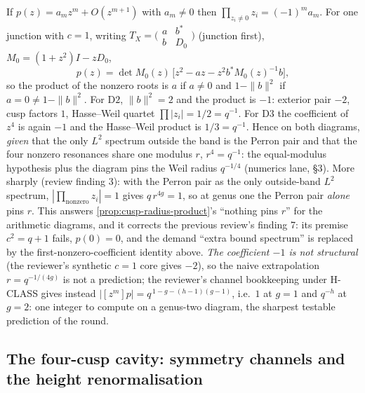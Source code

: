 \begin{proposition}
\label{prop:nonzero-root-product}
If $p(z) = a_mz^m+O(z^{m+1})$ with $a_m\ne0$ then $\prod_{z_i\ne0}z_i = (-1)^ma_m$. For one junction with
$c = 1$, writing $T_X = \big(\begin{smallmatrix}a&b^{*}\\b&D_0\end{smallmatrix}\big)$ (junction first),
$M_0 = (1+z^2)I-zD_0$,
\[
p(z) = \det M_0(z)\,\big[z^2-az-z^2b^{*}M_0(z)^{-1}b\big],
\]
so the product of the nonzero roots is $a$ if $a\ne0$ and $1-\|b\|^2$ if $a = 0\ne1-\|b\|^2$. For
$\mathrm{D2}$, $\|b\|^2 = 2$ and the product is $-1$: exterior pair $-2$, cusp factors $1$, Hasse--Weil
quartet $\prod|z_i| = 1/2 = q^{-1}$. For $\mathrm{D3}$ the coefficient of $z^4$ is again $-1$ and the
Hasse--Weil product is $1/3 = q^{-1}$. Hence on both diagrams, \emph{given} that the only $L^2$ spectrum
outside the band is the Perron pair and that the four nonzero resonances share one modulus $r$,
$r^4 = q^{-1}$: the equal-modulus hypothesis plus the diagram pins the Weil radius $q^{-1/4}$ (numerics
lane, \S3). More sharply (review finding 3): with the Perron pair as the only outside-band $L^2$ spectrum,
$|\prod_{\text{nonzero}}z_i| = 1$ gives $q\,r^{4g} = 1$, so at genus one the Perron pair \emph{alone} pins $r$.
This answers \cref{prop:cusp-radius-product}'s ``nothing pins $r$'' for the arithmetic diagrams, and it corrects the
previous review's finding 7: its premise $c^2 = q+1$ fails, $p(0) = 0$, and the demand ``extra bound spectrum'' is
replaced by the first-nonzero-coefficient identity above. \emph{The coefficient $-1$ is not structural} (the
reviewer's synthetic $c = 1$ core gives $-2$), so the naive extrapolation $r = q^{-1/(4g)}$ is not a prediction; the
reviewer's channel bookkeeping under H-CLASS gives instead $|[z^m]p| = q^{\,1-g-(h-1)(g-1)}$, i.e.\ $1$ at $g = 1$ and
$q^{-h}$ at $g = 2$: one integer to compute on a genus-two diagram, the sharpest testable prediction of the round.
\end{proposition}

\subsection{The four-cusp cavity: symmetry channels and the height renormalisation}

